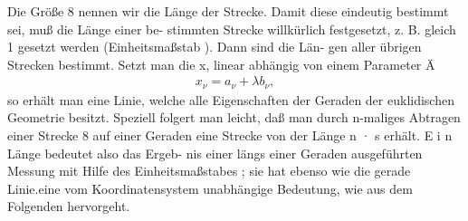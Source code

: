 
Die Größe 8 nennen wir die Länge der Strecke. Damit
diese eindeutig bestimmt sei, muß die Länge einer be-
stimmten Strecke willkürlich festgesetzt, z. B. gleich 1
gesetzt werden (Einheitsmaßstab ). Dann sind die Län-
gen aller übrigen Strecken bestimmt. Setzt man die x,
linear abhängig von einem Parameter Ä
\begin{align*}
    x_{\nu} = a_{\nu} + \lambda b_{\nu},
\end{align*}
so erhält man eine Linie, welche alle Eigenschaften der
Geraden der euklidischen Geometrie besitzt. Speziell
folgert man leicht, daß man durch n-maliges Abtragen
einer Strecke 8 auf einer Geraden eine Strecke von der
Länge n · s erhält.
E
i
n
~
Länge bedeutet also das Ergeb-
nis einer längs einer Geraden ausgeführten Messung mit
Hilfe des Einheitsmaßstabes ; sie hat ebenso wie die
gerade Linie.eine vom Koordinatensystem unabhängige
Bedeutung, wie aus dem Folgenden hervorgeht.

